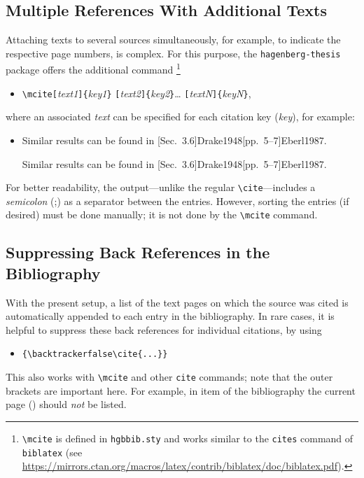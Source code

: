 \subsection{Multiple References With Additional Texts}

Attaching texts to several sources simultaneously, for example, to indicate the
respective page numbers, is complex. For this purpose, the
\texttt{hagenberg-thesis} package offers the additional command%
\footnote{\texttt{\textbackslash mcite} is defined in \texttt{hgbbib.sty} and
works similar to the \texttt{{\bs}cites} command of \texttt{biblatex}
(see \url{https://mirrors.ctan.org/macros/latex/contrib/biblatex/doc/biblatex.pdf}).}
%
\begin{itemize}
\item[]
\verb!\mcite[!\textit{text1}\verb!]{!\textit{key1}\verb!}!%
      \verb![!\textit{text2}\verb!]{!\textit{key2}\verb!}!\ldots%
			\verb![!\textit{textN}\verb!]{!\textit{keyN}\verb!}!,
\end{itemize}
%
where an associated \textit{text} can be specified for each citation key
(\textit{key}), for example:
%
\begin{itemize}
    \item Similar results can be found in 
    [Sec.~3.6]{Drake1948}[pp.~5--7]{Eberl1987}.
\begin{LaTeXCode}[numbers=none]
Similar results can be found in 
[Sec.~3.6]{Drake1948}[pp.~5--7]{Eberl1987}.
\end{LaTeXCode}
\end{itemize}
%
For better readability, the output---unlike the regular
\texttt{\textbackslash cite}---includes a \emph{semicolon} (;) as a separator
between the entries. However, sorting the entries (if desired) must be done
manually; it is not done by the \texttt{\textbackslash mcite} command.


\subsection{Suppressing Back References in the Bibliography}

With the present setup, a list of the text pages on which the source was cited
is automatically appended to each entry in the bibliography. In rare cases, it
is helpful to suppress these back references for individual citations, by using
%
\begin{itemize}
    \item[] \verb!{\backtrackerfalse\cite{...}}!
\end{itemize}
%
This also works with \verb!\mcite! and other \verb!cite! commands; note that 
the outer brackets are important here. For example, in item
{\backtrackerfalse\parencite{Bezos2026}} of the bibliography 
the current page (\the\value{page}) should \emph{not} be listed.

